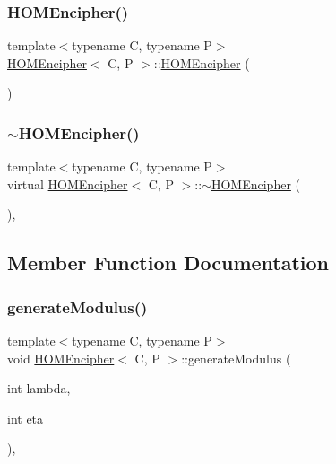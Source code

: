 \subsubsection{\texorpdfstring{H\+O\+M\+Encipher()}{HOMEncipher()}}
{\footnotesize\ttfamily template$<$typename C, typename P$>$ \\
\hyperlink{classHOMEncipher}{H\+O\+M\+Encipher}$<$ C, P $>$\+::\hyperlink{classHOMEncipher}{H\+O\+M\+Encipher} (\begin{DoxyParamCaption}{ }\end{DoxyParamCaption})\hspace{0.3cm}{\ttfamily [inline]}}

\mbox{\label{classHOMEncipher_a93b5c48425b0ac327757795703ecd2d7}} 
\subsubsection{\texorpdfstring{$\sim$\+H\+O\+M\+Encipher()}{~HOMEncipher()}}
{\footnotesize\ttfamily template$<$typename C, typename P$>$ \\
virtual \hyperlink{classHOMEncipher}{H\+O\+M\+Encipher}$<$ C, P $>$\+::$\sim$\hyperlink{classHOMEncipher}{H\+O\+M\+Encipher} (\begin{DoxyParamCaption}{ }\end{DoxyParamCaption})\hspace{0.3cm}{\ttfamily [inline]}, {\ttfamily [virtual]}}



\subsection{Member Function Documentation}
\mbox{\label{classHOMEncipher_a6a715a6beed3174acc8d812d570462ca}} 
\subsubsection{\texorpdfstring{generate\+Modulus()}{generateModulus()}}
{\footnotesize\ttfamily template$<$typename C, typename P$>$ \\
void \hyperlink{classHOMEncipher}{H\+O\+M\+Encipher}$<$ C, P $>$\+::generate\+Modulus (\begin{DoxyParamCaption}\item[{int}]{lambda,  }\item[{int}]{eta }\end{DoxyParamCaption})\hspace{0.3cm}{\ttfamily [inline]}, {\ttfamily [protected]}}

